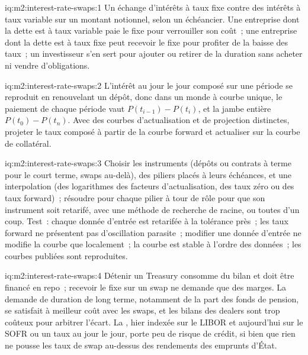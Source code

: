 \begin{solution}{iq:m2:interest-rate-swaps:1}
Un échange d'intérêts à taux fixe contre des intérêts à taux variable sur un montant
notionnel, selon un échéancier. Une entreprise dont la dette est à taux variable paie le fixe pour
verrouiller son coût~; une entreprise dont la dette est à taux fixe peut recevoir le fixe pour profiter de la baisse des taux~;
un investisseur s'en sert pour ajouter ou retirer de la duration sans acheter ni vendre d'obligations.
\end{solution}

\begin{solution}{iq:m2:interest-rate-swaps:2}
L'intérêt au jour le jour composé sur une période se reproduit en renouvelant un dépôt,
donc dans un monde à courbe unique, le paiement de chaque période vaut $P(t_{i-1}) -
P(t_i)$, et la jambe entière $P(t_0) - P(t_n)$. Avec des courbes d'actualisation et
de projection distinctes, projeter le taux composé à partir de la courbe forward et
actualiser sur la courbe de collatéral.
\end{solution}

\begin{solution}{iq:m2:interest-rate-swaps:3}
Choisir les instruments (dépôts ou contrats à terme pour le court terme, swaps au-delà), des piliers
placés à leurs échéances, et une interpolation (des logarithmes des facteurs d'actualisation, des taux
zéro ou des taux forward)~; résoudre pour chaque pilier à tour de rôle pour que son instrument soit
retarifé, avec une méthode de recherche de racine, ou toutes d'un coup. Test~: chaque donnée d'entrée est
retarifée à la tolérance près~; les taux forward ne présentent pas d'oscillation parasite~; modifier une
donnée d'entrée ne modifie la courbe que localement~; la courbe est stable à l'ordre des données~; les
courbes publiées sont reproduites.
\end{solution}

\begin{solution}{iq:m2:interest-rate-swaps:4}
Détenir un Treasury consomme du bilan et doit être financé en repo~; recevoir le fixe sur un swap
ne demande que des marges. La demande de duration de long terme, notamment de la part des fonds de
pension, se satisfait à meilleur coût avec les swaps, et les bilans des dealers sont trop coûteux
pour arbitrer l'écart. La , hier indexée sur le LIBOR et aujourd'hui sur le SOFR
ou un taux au jour le jour, porte peu de risque de crédit, si bien que rien ne pousse les taux de swap
au-dessus des rendements des emprunts d'État.
\end{solution}

